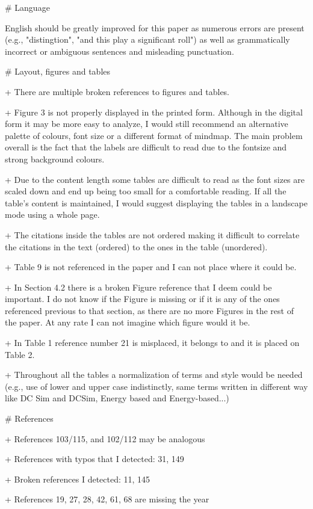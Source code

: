 # Language

English should be greatly improved for this paper as numerous errors are present (e.g., "distingtion", "and this play a significant roll") as well as grammatically incorrect or ambiguous sentences and misleading punctuation.


# Layout, figures and tables

+ There are multiple broken references to figures and tables.

+ Figure 3 is not properly displayed in the printed form. Although in the digital form it may be more easy to analyze, I would still recommend an alternative palette of colours, font size or a different format of mindmap. The main problem overall is the fact that the labels are difficult to read due to the fontsize and strong background colours.

+ Due to the content length some tables are difficult to read as the font sizes are scaled down and end up being too small for a comfortable reading. If all the table's content is maintained, I would suggest displaying the tables in a landscape mode using a whole page.

+ The citations inside the tables are not ordered making it difficult to correlate the citations in the text (ordered) to the ones in the table (unordered).

+ Table 9 is not referenced in the paper and I can not place where it could be.

+ In Section 4.2 there is a broken Figure reference that I deem could be important. I do not know if the Figure is missing or if it is any of the ones referenced previous to that section, as there are no more Figures in the rest of the paper. At any rate I can not imagine which figure would it be.

+ In Table 1 reference number 21 is misplaced, it belongs to and it is placed on Table 2.

+ Throughout all the tables a normalization of terms and style would be needed (e.g., use of lower and upper case indistinctly, same terms written in different way like DC Sim and DCSim, Energy based and Energy-based...)


# References

+ References 103/115, and 102/112 may be analogous

+ References with typos that I detected: 31, 149

+ Broken references I detected: 11, 145

+ References 19, 27, 28, 42, 61, 68 are missing the year

